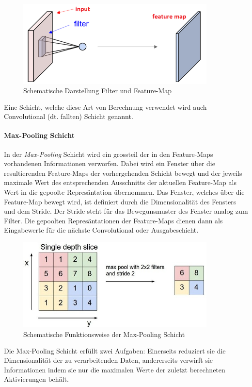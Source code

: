 \begin{figure}[h]
	\centering
	\includegraphics[width=10cm]{img/filter_feature_map}
	\caption{Schematische Darstellung Filter und Feature-Map}
\end{figure}

Eine Schicht, welche diese Art von Berechnung verwendet wird auch Convolutional (dt. fallten) Schicht genannt.

\paragraph{Max-Pooling Schicht} In der \emph{Max-Pooling} Schicht wird ein grossteil der in den Feature-Maps vorhandenen Informationen verworfen. Dabei wird ein Fenster über die resultierenden Feature-Maps der vorhergehenden Schicht bewegt und der jeweils maximale Wert des entsprechenden Ausschnitts der aktuellen Feature-Map als Wert in die gepoolte Represäntation übernommen. Das Fenster, welches über die Feature-Map bewegt wird, ist definiert durch die Dimensionalität des Fensters und dem Stride. Der Stride steht für das Bewegunsmuster des Fenster analog zum Filter. Die gepoolten Represäntationen der Feature-Maps dienen dann als Eingabewerte für die nächste Convolutional oder Ausgabeschicht.

\begin{figure}[H]
	\centering
	\includegraphics[width=10cm]{img/max_pooling}
	\caption{Schematische Funktionsweise der Max-Pooling Schicht}
\end{figure}

Die Max-Pooling Schicht erfüllt zwei Aufgaben: Einerseits reduziert sie die Dimensionalität der zu verarbeitenden Daten, andererseits verwirft sie  Informationen indem sie nur die maximalen Werte der zuletzt berechneten Aktivierungen behält.

